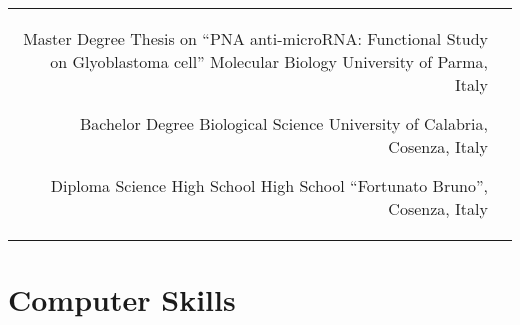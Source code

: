 \documentclass[10pt]{article} %
\begin{document}
\begin{paracol}{2}




\begin{supertabular}{rl} %

	
	{Master Degree} %
	{Thesis on “PNA anti-microRNA: Functional Study on Glyoblastoma cell”} %
	{Molecular Biology} %
	{University of Parma, Italy} %
	
	
	{Bachelor Degree} %
	{} %
	{Biological Science} %
	{University of Calabria, Cosenza, Italy} %
	
	
	{Diploma} %
	{} %
	{Science High School} %
	{High School “Fortunato Bruno”, Cosenza, Italy} %
	

\end{supertabular}



\section{Computer Skills} 




\end{paracol}
\end{document}
